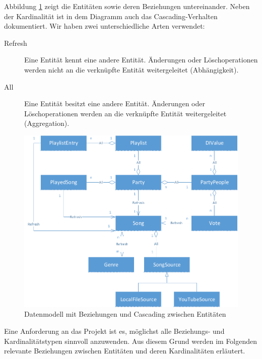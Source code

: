 Abbildung \ref{fig:Datenmodell} zeigt die Entitäten sowie deren Beziehungen untereinander. Neben der Kardinalität ist in dem Diagramm auch das Cascading-Verhalten dokumentiert. Wir haben zwei unterschiedliche Arten verwendet:
\begin{description}
	\item[Refresh] Eine Entität kennt eine andere Entität. Änderungen oder Löschoperationen werden nicht an die verknüpfte Entität weitergeleitet (Abhängigkeit).
	\item[All] Eine Entität besitzt eine andere Entität. 
	Änderungen oder Löschoperationen werden an die 
	verknüpfte Entität weitergeleitet (Aggregation).
\end{description}

\vspace{8pt}
\begin{figure}[htb]
\centering
\includegraphics[width=1\linewidth]{Bilder/Datenmodell}
\caption{Datenmodell mit Beziehungen und Cascading zwischen Entitäten}
\label{fig:Datenmodell}
\end{figure}

Eine Anforderung an das Projekt ist es, möglichst alle Beziehungs- und Kardinalitätstypen sinnvoll anzuwenden. Aus diesem Grund werden im Folgenden relevante Beziehungen zwischen Entitäten und deren Kardinalitäten erläutert.

